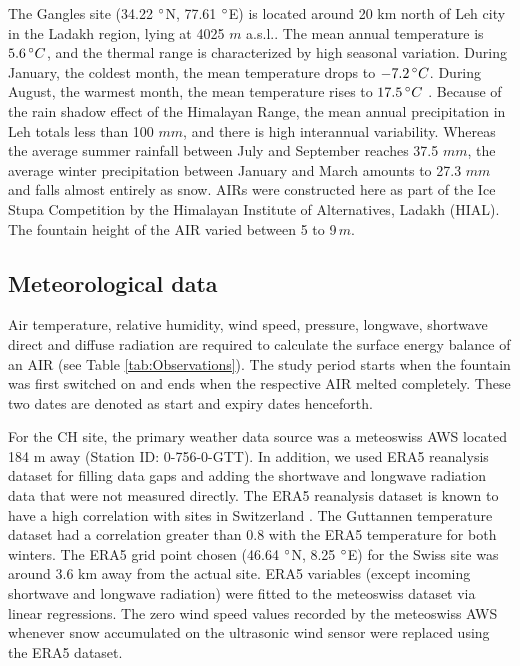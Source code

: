 \documentclass[utf8]{frontiersSCNS}
\begin{document}
The Gangles site (34.22 $\degree$N, 77.61 $\degree$E) is located around 20 km north of Leh city in the Ladakh
region, lying at 4025 $m$ a.s.l.. The mean annual temperature is $5.6 \, \degree C$, and the thermal range is
characterized by high seasonal variation. During January, the coldest month, the mean temperature drops to $-7.2
\, \degree C$. During August, the warmest month, the mean temperature rises to $17.5 \, \degree C$
\citep{Nusser_2012}. Because of the rain shadow effect of the Himalayan Range, the mean annual precipitation in Leh
totals less than 100 $mm$, and there is high interannual variability. Whereas the average summer rainfall between
July and September reaches 37.5 $mm$, the average winter precipitation between January and March amounts to 27.3 $
mm$ and falls almost entirely as snow.  AIRs were constructed here as part of the Ice Stupa Competition by the
Himalayan Institute of Alternatives, Ladakh (HIAL). The fountain height of the AIR varied between 5 to 9\,$m$.

\subsection{Meteorological data}

Air temperature, relative humidity, wind speed, pressure, longwave, shortwave direct and diffuse radiation are
required to calculate the surface energy balance of an AIR (see Table \ref{tab:Observations}). The study period
starts when the fountain was first switched on and ends when the respective AIR melted completely. These two
dates are denoted as start and expiry dates henceforth.

For the CH site, the primary weather data source was a meteoswiss AWS located 184 m away (Station ID: 0-756-0-GTT).
In addition, we used ERA5 reanalysis dataset \citep{era5} for filling data gaps and adding the shortwave and
longwave radiation data that were not measured directly. The ERA5 reanalysis dataset is known to have a high
correlation with sites in Switzerland \citep{Scherrer_2020}. The Guttannen temperature dataset had a correlation
greater than 0.8 with the ERA5 temperature for both winters.  The ERA5 grid point chosen (46.64 $\degree$N,
8.25 $\degree$E) for the Swiss site was around 3.6 km away from the actual site. ERA5 variables (except incoming
shortwave and longwave radiation) were fitted to the meteoswiss dataset via linear regressions. The zero wind
speed values recorded by the meteoswiss AWS whenever snow accumulated on the ultrasonic wind sensor were
replaced using the ERA5 dataset. 
\end{document}
